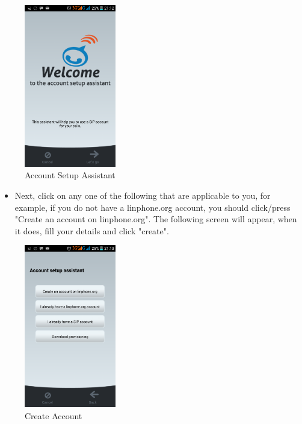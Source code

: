 \documentclass[a4paper]{article}
\begin{document}
\begin{figure}[h]
\centering
\includegraphics[scale=0.30, width=40mm]{./pictures/welcome.png}
\caption{\label{fig:Agile}Account Setup Assistant}
\end{figure}

\begin{itemize}
\item Next, click on any  one of the following that are applicable to you, for example, if you do not have a linphone.org account, you should click/press "Create an account on linphone.org". The following screen will appear, when it does, fill your details and click "create".
\end{itemize}

\begin{figure}[h]
\centering
\includegraphics[scale=0.30, width=40mm]{./pictures/options.png}
\caption{\label{fig:Agile}Create Account}
\end{figure}
\end{document}
